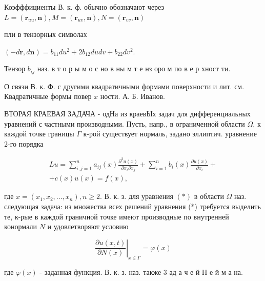 \documentclass[10pt]{article}
\begin{document}
Коэфффициенты В. к. ф. обычно обозначают через $L=\left(\boldsymbol{r}_{u u}, \boldsymbol{n}\right), M=\left(\boldsymbol{r}_{u v}, \boldsymbol{n}\right), N=\left(\boldsymbol{r}_{v v}, \boldsymbol{n}\right)$



пли в тензорных символах



$(-d \boldsymbol{r}, d \boldsymbol{n})=b_{11} d u^{2}+2 b_{12} d u d v+b_{22} d v^{2}$.



Тензор $b_{i j}$ наз. в т о р ы м о с но в ны м т е нз оро м по в е р хност ти.



О связи В. к. Ф. с другими квадратичными формами поверхности и лит. см. Квадратичные формы повер $x$ ности. А. Б. Иванов.



ВТОРАЯ КРАЕВАЯ ЗАДАЧА - одНа из краевЫх задач для дифференциальных уравнений с частными производными. Пусть, напр., в ограниченной области $\Omega$, к каждой точке границы $\Gamma$ к-рой существует нормаль, задано эллиптич. уравнение 2-го порядка



\[

\begin{gathered}

L u=\sum_{i, j=1}^{n} a_{i j}(x) \frac{\partial^{2} u(x)}{\partial x_{i} \partial x_{j}}+\sum_{i=1}^{n} b_{i}(x) \frac{\partial u(x)}{\partial x_{i}}+ \\

+c(x) u(x)=f(x),

\end{gathered}

\]



где $x=\left(x_{1}, x_{2}, \ldots, x_{n}\right), n \geqslant 2$. В. к. з. для уравнения $(*)$ в области $\Omega$ наз. следующая задача: из множества всех решений уравнения (*) требуется выделить те, к-рые в каждой граничной точке имеют производные по внутренней конормали $N$ и удовлетворяют условию



\[

\left.\frac{\partial u(x, t)}{\partial N(x)}\right|_{x \in \Gamma}=\varphi(x)

\]



где $\varphi(x)$ - заданная функция. В. к. з. наз. также 3 ад а ч е й Н е й м а на.
\end{document}

